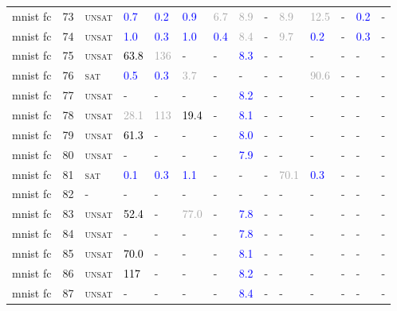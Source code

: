 \begin{center}
{\begin{longtable}{@{}llllllllllllll@{}}
mnist fc & 73 & \textsc{unsat} & \textcolor{blue}{0.7} & \textcolor{blue}{0.2} & \textcolor{blue}{0.9} & \textcolor{darkgray}{6.7} & \textcolor{darkgray}{8.9} & - & \textcolor{darkgray}{8.9} & \textcolor{darkgray}{12.5} & - & \textcolor{blue}{0.2} & - \\
mnist fc & 74 & \textsc{unsat} & \textcolor{blue}{1.0} & \textcolor{blue}{0.3} & \textcolor{blue}{1.0} & \textcolor{blue}{0.4} & \textcolor{darkgray}{8.4} & - & \textcolor{darkgray}{9.7} & \textcolor{blue}{0.2} & - & \textcolor{blue}{0.3} & - \\
mnist fc & 75 & \textsc{unsat} & \textcolor{black}{63.8} & \textcolor{darkgray}{136} & - & - & \textcolor{blue}{8.3} & - & - & - & - & - & - \\
mnist fc & 76 & \textsc{sat} & \textcolor{blue}{0.5} & \textcolor{blue}{0.3} & \textcolor{darkgray}{3.7} & - & - & - & - & \textcolor{darkgray}{90.6} & - & - & - \\
mnist fc & 77 & \textsc{unsat} & - & - & - & - & \textcolor{blue}{8.2} & - & - & - & - & - & - \\
mnist fc & 78 & \textsc{unsat} & \textcolor{darkgray}{28.1} & \textcolor{darkgray}{113} & \textcolor{black}{19.4} & - & \textcolor{blue}{8.1} & - & - & - & - & - & - \\
mnist fc & 79 & \textsc{unsat} & \textcolor{black}{61.3} & - & - & - & \textcolor{blue}{8.0} & - & - & - & - & - & - \\
mnist fc & 80 & \textsc{unsat} & - & - & - & - & \textcolor{blue}{7.9} & - & - & - & - & - & - \\
mnist fc & 81 & \textsc{sat} & \textcolor{blue}{0.1} & \textcolor{blue}{0.3} & \textcolor{blue}{1.1} & - & - & - & \textcolor{darkgray}{70.1} & \textcolor{blue}{0.3} & - & - & - \\
mnist fc & 82 & - & - & - & - & - & - & - & - & - & - & - & - \\
mnist fc & 83 & \textsc{unsat} & \textcolor{black}{52.4} & - & \textcolor{darkgray}{77.0} & - & \textcolor{blue}{7.8} & - & - & - & - & - & - \\
mnist fc & 84 & \textsc{unsat} & - & - & - & - & \textcolor{blue}{7.8} & - & - & - & - & - & - \\
mnist fc & 85 & \textsc{unsat} & \textcolor{black}{70.0} & - & - & - & \textcolor{blue}{8.1} & - & - & - & - & - & - \\
mnist fc & 86 & \textsc{unsat} & \textcolor{black}{117} & - & - & - & \textcolor{blue}{8.2} & - & - & - & - & - & - \\
mnist fc & 87 & \textsc{unsat} & - & - & - & - & \textcolor{blue}{8.4} & - & - & - & - & - & - \\

\end{longtable}}
\end{center}
